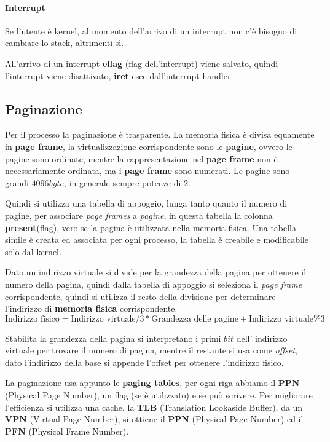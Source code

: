 \paragraph{Interrupt}
Se l'utente è kernel, al momento dell'arrivo di un interrupt non c'è bisogno
di cambiare lo stack, altrimenti sì.

All'arrivo di un interrupt \textbf{eflag} (flag dell'interrupt) viene salvato,
quindi l'interrupt viene disattivato, \textbf{iret} esce dall'interrupt
handler.


\subsection{Paginazione}
Per il processo la paginazione è trasparente.
La memoria fisica è divisa equamente in \textbf{page frame}, la
virtualizzazione corrispondente sono le \textbf{pagine}, ovvero le pagine sono
ordinate, mentre la rappresentazione nel \textbf{page frame} non è
necessariamente ordinata, ma i \textbf{page frame} sono numerati.
Le pagine sono grandi $4096byte$, in generale sempre potenze di $2$.


Quindi si utilizza una tabella di appoggio, lunga tanto quanto il numero di
pagine, per associare \emph{page frames} a \emph{pagine}, in questa tabella la
colonna \textbf{present}(flag), vero se la pagina è utilizzata nella memoria
fisica.
Una tabella simile è creata ed associata per ogni processo, la tabella è
creabile e modificabile solo dal kernel.


Dato un indirizzo virtuale si divide per la grandezza della pagina per ottenere
il numero della pagina, quindi dalla tabella di appoggio si seleziona il \emph{
page frame} corrispondente, quindi si utilizza il resto della divisione per
determinare l'indirizzo di \textbf{memoria fisica} corrispondente.
\[
  \text{Indirizzo fisico} = \text{Indirizzo virtuale}/3 * \text{Grandezza delle
  pagine} + \text{Indirizzo virtuale} \% 3 
\]

Stabilita la grandezza della pagina si interpretano i primi $bit$ dell' 
indirizzo virtuale per trovare il numero di pagina, mentre il restante si usa
come \emph{offset}, dato l'indirizzo della base si appende l'offset per
ottenere l'indirizzo fisico.


La paginazione usa appunto le \textbf{paging tables}, per ogni riga abbiamo
il \textbf{PPN} (Physical Page Number), un flag (se è utilizzato) e se può
scrivere.
Per migliorare l'efficienza si utilizza una cache, la \textbf{TLB} (Translation
Lookaside Buffer), da un \textbf{VPN} (Virtual Page Number), si ottiene il
\textbf{PPN} (Physical Page Number) ed il \textbf{PFN} (Physical Frame Number).


